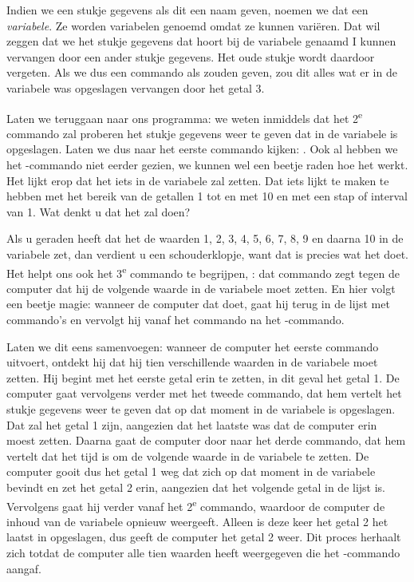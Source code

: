 Indien we een stukje gegevens als dit een naam geven, noemen we dat een {\em variabele}. Ze worden variabelen genoemd omdat ze kunnen variëren. Dat wil zeggen dat we het stukje gegevens dat hoort bij de variabele genaamd I kunnen vervangen door een ander stukje gegevens. Het oude stukje wordt daardoor vergeten. Als we dus een commando als  zouden geven, zou dit alles wat er in de variabele  was opgeslagen vervangen door het getal 3.

Laten we teruggaan naar ons programma: we weten inmiddels dat het 2\textsuperscript{e} commando zal proberen het stukje gegevens weer te geven dat in de variabele  is opgeslagen. Laten we dus naar het eerste commando kijken: . Ook al hebben we het -commando niet eerder gezien, we kunnen wel een beetje raden hoe het werkt. Het lijkt erop dat het iets in de variabele  zal zetten. Dat iets lijkt te maken te hebben met het bereik van de getallen 1 tot en met 10 en met een stap of interval van 1. Wat denkt u dat het zal doen?

Als u geraden heeft dat het de waarden 1, 2, 3, 4, 5, 6, 7, 8, 9 en daarna 10 in de variabele  zet, dan verdient u een schouderklopje, want dat is precies wat het doet. Het helpt ons ook het 3\textsuperscript{e} commando te begrijpen, : dat commando zegt tegen de computer dat hij de volgende waarde in de variabele  moet zetten. En hier volgt een beetje magie: wanneer de computer dat doet, gaat hij terug in de lijst met commando's en vervolgt hij vanaf het commando na het -commando.

Laten we dit eens samenvoegen: wanneer de computer het eerste commando uitvoert, ontdekt hij dat hij tien verschillende waarden in de variabele  moet zetten. Hij begint met het eerste getal erin te zetten, in dit geval het getal 1. De computer gaat vervolgens verder met het tweede commando, dat hem vertelt het stukje gegevens weer te geven dat op dat moment in de variabele  is opgeslagen. Dat zal het getal 1 zijn, aangezien dat het laatste was dat de computer erin moest zetten. Daarna gaat de computer door naar het derde commando, dat hem vertelt dat het tijd is om de volgende waarde in de variabele  te zetten. De computer gooit dus het getal 1 weg dat zich op dat moment in de variabele  bevindt en zet het getal 2 erin, aangezien dat het volgende getal in de lijst is. Vervolgens gaat hij verder vanaf het 2\textsuperscript{e} commando, waardoor de computer de inhoud van de variabele  opnieuw weergeeft. Alleen is deze keer het getal 2 het laatst in  opgeslagen, dus geeft de computer het getal 2 weer. Dit proces herhaalt zich totdat de computer alle tien waarden heeft weergegeven die het -commando aangaf.

